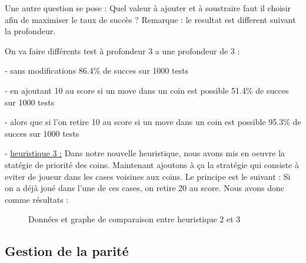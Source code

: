 \documentclass{report}
\begin{document}
Une autre question se pose : Quel valeur à ajouter et à soustraire faut il choisir afin de maximiser le taux de succès ?
Remarque : le resultat est different suivant la profondeur.

On va faire différents test à profondeur 3
a une profondeur de 3 :

- sans modifications
86.4\% de succes sur 1000 tests

- en ajoutant 10 au score si un move dans un coin est possible
51.4\% de succes sur 1000 tests

- alors que si l'on retire 10 au score si un move dans un coin est possible
95.3\% de succes sur 1000 tests
\newline

- \underline{heuristique 3 :}
Dans notre nouvelle heuristique, nous avons mis en oeuvre la statégie de priorité des coins. Maintenant ajoutons à ça la stratégie qui consiste à eviter de joueur dans les cases voisines aux coins. Le principe est le suivant : Si on a déjà joué dans l'une de ces cases, on retire 20 au score.
\newline
Nous avons donc comme résultats :

\begin{figure}[!h]
\begin{center}
\caption{Données et graphe de comparaison entre heuristique 2 et 3}
\end{center}

\end{figure}


\subsection{Gestion de la parité}
\end{document}
